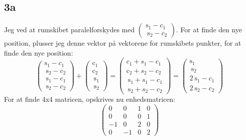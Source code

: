 \documentclass{article}
\begin{document}
\subsection*{3a}
Jeg ved at rumskibet paralelforskydes med $\left(\begin{array}{c}\mathrm{s}_1-c_1 \\ \mathrm{~s}_2-c_2\end{array}\right)$. For at finde den nye position, plusser jeg denne vektor på vektorene for rumskibets punkter, for at finde den nye position:
$$
\left(\begin{array}{c}
\mathrm{s}_1-c_1 \\
\mathrm{~s}_2-c_2 \\
\mathrm{~s}_1-c_1 \\
\mathrm{~s}_2-c_2
\end{array}\right)+\left(\begin{array}{c}
\mathrm{c}_1 \\
\mathrm{c}_2 \\
\mathrm{~s}_1 \\
\mathrm{~s}_2
\end{array}\right)=\left(\begin{array}{c}
\mathrm{c}_1+s_1-c_1 \\
\mathrm{c}_2+s_2-c_2 \\
\mathrm{~s}_1+s_1-c_1 \\
\mathrm{~s}_2+s_2-c_2
\end{array}\right)=\left(\begin{array}{c}
\mathrm{s}_1 \\
\mathrm{~s}_2 \\
2 \mathrm{~s}_1-c_1 \\
2 \mathrm{~s}_2-c_2
\end{array}\right)
$$
For at finde 4x4 matricen, opskrives nu enhedsmatricen:
$$
\left(\begin{array}{cccc}
0 & 0 & 1 & 0 \\
0 & 0 & 0 & 1 \\
-1 & 0 & 2 & 0 \\
0 & -1 & 0 & 2
\end{array}\right)
$$
\end{document}
